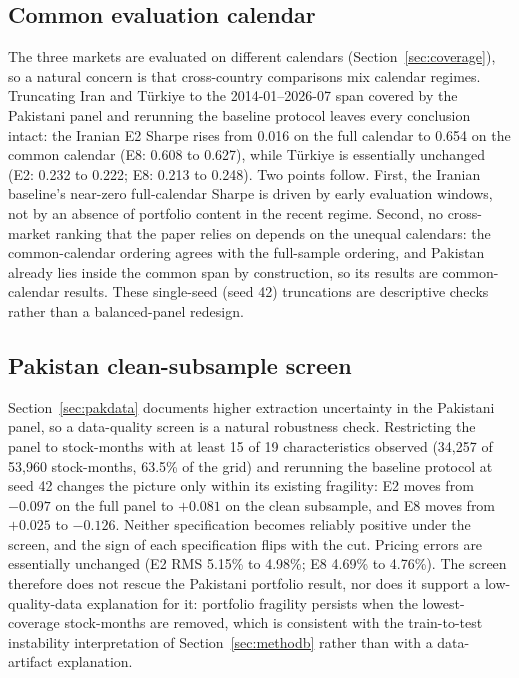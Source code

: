 \documentclass[12pt]{article}
\begin{document}
\subsection{Common evaluation calendar}

The three markets are evaluated on different calendars (Section~\ref{sec:coverage}), so a natural concern is that cross-country comparisons mix calendar regimes. Truncating Iran and T\"urkiye to the 2014-01--2026-07 span covered by the Pakistani panel and rerunning the baseline protocol leaves every conclusion intact: the Iranian E2 Sharpe rises from 0.016 on the full calendar to 0.654 on the common calendar (E8: 0.608 to 0.627), while T\"urkiye is essentially unchanged (E2: 0.232 to 0.222; E8: 0.213 to 0.248). Two points follow. First, the Iranian baseline's near-zero full-calendar Sharpe is driven by early evaluation windows, not by an absence of portfolio content in the recent regime. Second, no cross-market ranking that the paper relies on depends on the unequal calendars: the common-calendar ordering agrees with the full-sample ordering, and Pakistan already lies inside the common span by construction, so its results are common-calendar results. These single-seed (seed 42) truncations are descriptive checks rather than a balanced-panel redesign.

\subsection{Pakistan clean-subsample screen}

Section~\ref{sec:pakdata} documents higher extraction uncertainty in the Pakistani panel, so a data-quality screen is a natural robustness check. Restricting the panel to stock-months with at least 15 of 19 characteristics observed (34,257 of 53,960 stock-months, 63.5\% of the grid) and rerunning the baseline protocol at seed 42 changes the picture only within its existing fragility: E2 moves from $-0.097$ on the full panel to $+0.081$ on the clean subsample, and E8 moves from $+0.025$ to $-0.126$. Neither specification becomes reliably positive under the screen, and the sign of each specification flips with the cut. Pricing errors are essentially unchanged (E2 RMS 5.15\% to 4.98\%; E8 4.69\% to 4.76\%). The screen therefore does not rescue the Pakistani portfolio result, nor does it support a low-quality-data explanation for it: portfolio fragility persists when the lowest-coverage stock-months are removed, which is consistent with the train-to-test instability interpretation of Section~\ref{sec:methodb} rather than with a data-artifact explanation.
\end{document}
